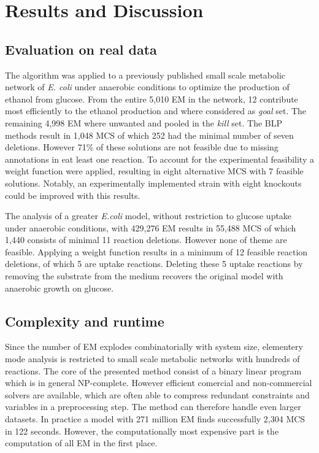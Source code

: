 \documentclass{llncs}
\begin{document}
\section{Results and Discussion}

\subsection{Evaluation on real data}

The algorithm was applied to a previously published small scale 
metabolic network of \emph{E. coli} under anaerobic conditions to 
optimize the production of ethanol from glucose.
From the entire 5,010 EM in the network, 12 contribute most efficiently
to the ethanol production and where considered as \emph{goal} set. The
remaining 4,998 EM where unwanted and pooled in the \emph{kill} set.
The BLP methods result in 1,048 MCS of which 252 had the minimal number of
seven deletions. 
However 71\% of these solutions are not feasible due to
missing annotations in eat least one reaction.
To account for the experimental feasibility a weight function were applied,
resulting in eight alternative MCS with 7 feasible solutions.
Notably, an experimentally implemented strain with eight knockouts could
be improved with this results.

The analysis of a greater \emph{E.coli} model, without restriction to glucose uptake under
anaerobic conditions, with 429,276 EM results in 55,488 MCS of which 1,440
consists of minimal 11 reaction deletions.
However none of theme are feasible.
Applying a weight function results in a minimum of 12 feasible reaction 
deletions, of which 5 are uptake reactions.
Deleting these 5 uptake reactions by removing the substrate from the medium
recovers the original model with anaerobic growth on glucose.

\subsection{Complexity and runtime}

Since the number of EM explodes combinatorially with system size,
elementery mode analysis is restricted to small scale metabolic 
networks with hundreds of reactions.
The core of the presented method consist of a binary linear program which 
is in general NP-complete.
However efficient comercial and non-commercial solvers are available, 
which are often able to compress redundant constraints and variables 
in a preprocessing step.
The method can therefore handle even larger datasets.
In practice a model with 271 million EM finds successfully 2,304 MCS in 
122 seconds.
However, the computationally most expensive part is the computation of
all EM in the first place.
\end{document}
